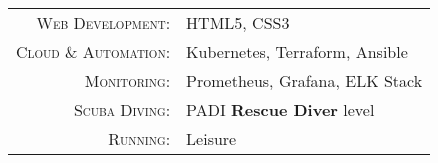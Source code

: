%
%
%


\begin{tabular}{rl}
    \textsc{Web Development:} & HTML5, CSS3 \\
    \textsc{Cloud \& Automation:} & Kubernetes, Terraform, Ansible \\
    \textsc{Monitoring:} & Prometheus, Grafana, ELK Stack \\
    \textsc{Scuba Diving:} & PADI \textbf{Rescue Diver} level \\
    \textsc{Running:} & Leisure \\
\end{tabular}
